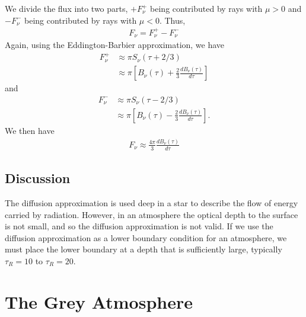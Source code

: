 We divide the flux into two parts, $+F_\nu^+$ being contributed by rays with $\mu > 0$ and $-F_\nu^-$ being contributed by rays with $\mu < 0$. Thus,
\begin{align}
F_\nu = F_\nu^+ - F_\nu^-
\end{align}
Again, using the Eddington-Barbier approximation, we have
\begin{align}
F_\nu^+ &\approx \pi S_\nu(\tau + 2/3)\\
&\approx \pi\left[B_\nu(\tau) + \frac{2}{3} \frac{dB_\nu(\tau)}{d\tau}\right]
\end{align}
and
\begin{align}
F_\nu^- &\approx \pi S_\nu(\tau - 2/3)\\
&\approx \pi\left[B_\nu(\tau) - \frac{2}{3} \frac{dB_\nu(\tau)}{d\tau}\right].
\end{align}
We then have
\begin{align}
F_\nu \approx \frac{4\pi}{3} \frac{dB_\nu(\tau)}{d\tau}
\end{align}

%

\newslide

\subsection{Discussion}

The diffusion approximation is used deep in a star to describe the flow of energy carried by radiation. However, in an atmosphere the optical depth to the surface is not small, and so the diffusion approximation is not valid. If we use the diffusion approximation as a lower boundary condition for an atmosphere, we must place the lower boundary at a depth that is sufficiently large, typically $\tau_R = 10$ to $\tau_R = 20$.

\newslide

\section{The Grey Atmosphere}

